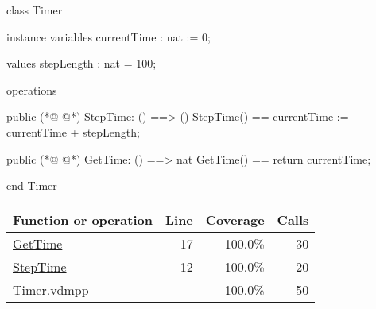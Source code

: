\begin{vdmpp}[breaklines=true]
class Timer 

instance variables
  currentTime : nat := 0;

values 
  stepLength : nat = 100;

operations

public 
(*@
\label{StepTime:12}
@*)
  StepTime: () ==> ()
  StepTime() == 
    currentTime := currentTime + stepLength;

public
(*@
\label{GetTime:17}
@*)
  GetTime: () ==> nat 
  GetTime() == return currentTime;

end Timer
\end{vdmpp}
\bigskip
\begin{longtable}{|l|r|r|r|}
\hline
Function or operation & Line & Coverage & Calls \\
\hline
\hline
\hyperref[GetTime:17]{GetTime} & 17&100.0\% & 30 \\
\hline
\hyperref[StepTime:12]{StepTime} & 12&100.0\% & 20 \\
\hline
\hline
Timer.vdmpp & & 100.0\% & 50 \\
\hline
\end{longtable}

